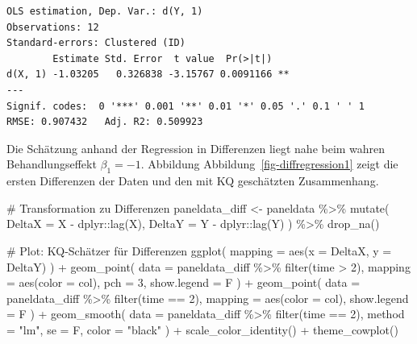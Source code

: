 \documentclass[
  a4paper,
  DIV=11,
  oneside]{scrreprt}
\newenvironment{Shaded}{\begin{snugshade}}{\end{snugshade}}
\newcommand{\AttributeTok}[1]{\textcolor[rgb]{0.40,0.45,0.13}{#1}}
\newcommand{\CommentTok}[1]{\textcolor[rgb]{0.37,0.37,0.37}{#1}}
\newcommand{\DecValTok}[1]{\textcolor[rgb]{0.68,0.00,0.00}{#1}}
\newcommand{\FunctionTok}[1]{\textcolor[rgb]{0.28,0.35,0.67}{#1}}
\newcommand{\NormalTok}[1]{\textcolor[rgb]{0.00,0.23,0.31}{#1}}
\newcommand{\OtherTok}[1]{\textcolor[rgb]{0.00,0.23,0.31}{#1}}
\newcommand{\SpecialCharTok}[1]{\textcolor[rgb]{0.37,0.37,0.37}{#1}}
\newcommand{\StringTok}[1]{\textcolor[rgb]{0.13,0.47,0.30}{#1}}
\begin{document}
\begin{verbatim}
OLS estimation, Dep. Var.: d(Y, 1)
Observations: 12
Standard-errors: Clustered (ID) 
        Estimate Std. Error  t value  Pr(>|t|)    
d(X, 1) -1.03205   0.326838 -3.15767 0.0091166 ** 
---
Signif. codes:  0 '***' 0.001 '**' 0.01 '*' 0.05 '.' 0.1 ' ' 1
RMSE: 0.907432   Adj. R2: 0.509923
\end{verbatim}

Die Schätzung anhand der Regression in Differenzen liegt nahe beim
wahren Behandlungseffekt \(\beta_1 = -1\). Abbildung
Abbildung~\ref{fig-diffregression1} zeigt die ersten Differenzen der
Daten und den mit KQ geschätzten Zusammenhang.

\begin{Shaded}
\begin{Highlighting}[]
\CommentTok{\# Transformation zu Differenzen}
\NormalTok{paneldata\_diff }\OtherTok{\textless{}{-}}\NormalTok{ paneldata }\SpecialCharTok{\%\textgreater{}\%} 
  \FunctionTok{mutate}\NormalTok{(}
    \AttributeTok{DeltaX =}\NormalTok{ X }\SpecialCharTok{{-}}\NormalTok{ dplyr}\SpecialCharTok{::}\FunctionTok{lag}\NormalTok{(X),}
    \AttributeTok{DeltaY =}\NormalTok{ Y }\SpecialCharTok{{-}}\NormalTok{ dplyr}\SpecialCharTok{::}\FunctionTok{lag}\NormalTok{(Y)}
\NormalTok{  ) }\SpecialCharTok{\%\textgreater{}\%}
  \FunctionTok{drop\_na}\NormalTok{()}

\CommentTok{\# Plot: KQ{-}Schätzer für Differenzen  }
  \FunctionTok{ggplot}\NormalTok{(}
    \AttributeTok{mapping =} \FunctionTok{aes}\NormalTok{(}\AttributeTok{x =}\NormalTok{ DeltaX, }\AttributeTok{y =}\NormalTok{ DeltaY)}
\NormalTok{  ) }\SpecialCharTok{+} 
    \FunctionTok{geom\_point}\NormalTok{(}
      \AttributeTok{data =}\NormalTok{ paneldata\_diff }\SpecialCharTok{\%\textgreater{}\%} 
        \FunctionTok{filter}\NormalTok{(time }\SpecialCharTok{\textgreater{}} \DecValTok{2}\NormalTok{),}
      \AttributeTok{mapping =} \FunctionTok{aes}\NormalTok{(}\AttributeTok{color =}\NormalTok{ col),}
      \AttributeTok{pch =} \DecValTok{3}\NormalTok{,}
      \AttributeTok{show.legend =}\NormalTok{ F}
\NormalTok{    ) }\SpecialCharTok{+}
    \FunctionTok{geom\_point}\NormalTok{(}
      \AttributeTok{data =}\NormalTok{ paneldata\_diff }\SpecialCharTok{\%\textgreater{}\%} 
        \FunctionTok{filter}\NormalTok{(time }\SpecialCharTok{==} \DecValTok{2}\NormalTok{),}
      \AttributeTok{mapping =} \FunctionTok{aes}\NormalTok{(}\AttributeTok{color =}\NormalTok{ col),}
      \AttributeTok{show.legend =}\NormalTok{ F}
\NormalTok{    ) }\SpecialCharTok{+}
  \FunctionTok{geom\_smooth}\NormalTok{(}
    \AttributeTok{data =}\NormalTok{ paneldata\_diff }\SpecialCharTok{\%\textgreater{}\%} 
      \FunctionTok{filter}\NormalTok{(time }\SpecialCharTok{==} \DecValTok{2}\NormalTok{),}
    \AttributeTok{method =} \StringTok{"lm"}\NormalTok{, }
    \AttributeTok{se =}\NormalTok{ F,}
    \AttributeTok{color =} \StringTok{"black"}
\NormalTok{  ) }\SpecialCharTok{+} 
  \FunctionTok{scale\_color\_identity}\NormalTok{() }\SpecialCharTok{+}
  \FunctionTok{theme\_cowplot}\NormalTok{()}
\end{Highlighting}
\end{Shaded}
\end{document}
